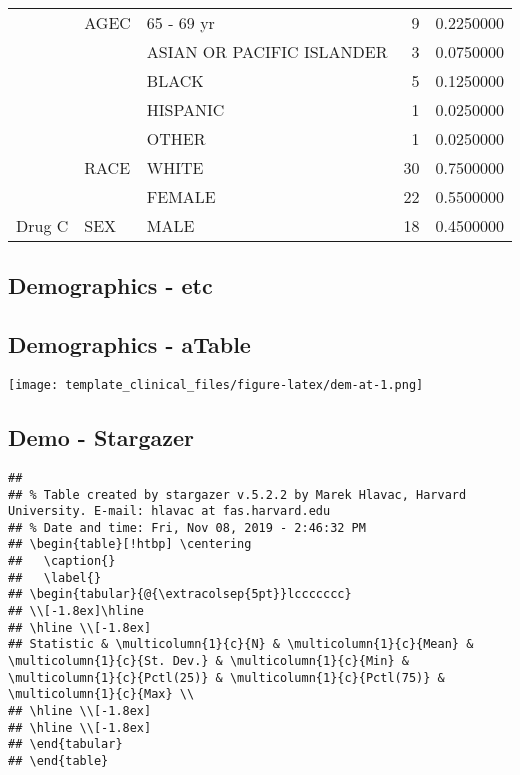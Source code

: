 \documentclass[]{article}
\begin{document}
\begin{table}[H]
\begin{tabular}{l|l|l|r|r}
\cline{3-5}
 & \multirow{-4}{*}{\raggedright\arraybackslash AGEC} & 65 - 69 yr & 9 & 0.2250000\\
\cline{2-5}
 &  & ASIAN OR PACIFIC ISLANDER & 3 & 0.0750000\\
\cline{3-5}
 &  & BLACK & 5 & 0.1250000\\
\cline{3-5}
 &  & HISPANIC & 1 & 0.0250000\\
\cline{3-5}
 &  & OTHER & 1 & 0.0250000\\
\cline{3-5}
 & \multirow{-5}{*}{\raggedright\arraybackslash RACE} & WHITE & 30 & 0.7500000\\
\cline{2-5}
 &  & FEMALE & 22 & 0.5500000\\
\cline{3-5}
\multirow{-11}{*}{\raggedright\arraybackslash Drug C} & \multirow{-2}{*}{\raggedright\arraybackslash SEX} & MALE & 18 & 0.4500000\\
\hline
\end{tabular}
\end{table}

\hypertarget{demographics---etc}{%
\subsection{Demographics - etc}\label{demographics---etc}}

\hypertarget{demographics---atable}{%
\subsection{Demographics - aTable}\label{demographics---atable}}

\texttt{[image: template\_clinical\_files/figure-latex/dem-at-1.png]}

\hypertarget{demo---stargazer}{%
\subsection{Demo - Stargazer}\label{demo---stargazer}}

\begin{verbatim}
## 
## % Table created by stargazer v.5.2.2 by Marek Hlavac, Harvard University. E-mail: hlavac at fas.harvard.edu
## % Date and time: Fri, Nov 08, 2019 - 2:46:32 PM
## \begin{table}[!htbp] \centering 
##   \caption{} 
##   \label{} 
## \begin{tabular}{@{\extracolsep{5pt}}lccccccc} 
## \\[-1.8ex]\hline 
## \hline \\[-1.8ex] 
## Statistic & \multicolumn{1}{c}{N} & \multicolumn{1}{c}{Mean} & \multicolumn{1}{c}{St. Dev.} & \multicolumn{1}{c}{Min} & \multicolumn{1}{c}{Pctl(25)} & \multicolumn{1}{c}{Pctl(75)} & \multicolumn{1}{c}{Max} \\ 
## \hline \\[-1.8ex] 
## \hline \\[-1.8ex] 
## \end{tabular} 
## \end{table}
\end{verbatim}
\end{document}
